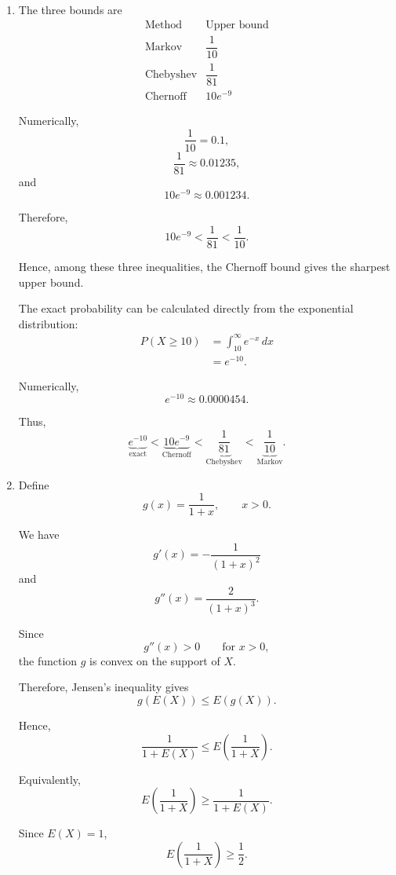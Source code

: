\documentclass[11pt]{article}
\newenvironment{solution}{
    \par
    \begin{tcolorbox}[
        colback=white,
        colframe=uwgold,
        boxrule=0.7pt,
        arc=2mm,
        left=3mm,
        right=3mm,
        top=2mm,
        bottom=2mm,
        breakable,
        before skip=0.5em,
        after skip=1em,
        title=\textbf{Solution},
        coltitle=uwpurple,
        fonttitle=\bfseries
    ]
}{
    \end{tcolorbox}
}
\begin{document}
\begin{solution}
\begin{enumerate}[label=(\alph*)]
\item The three bounds are
\[
\begin{array}{c|c}
\text{Method} & \text{Upper bound}\\
\hline
\text{Markov} & \dfrac{1}{10}\\[2mm]
\text{Chebyshev} & \dfrac{1}{81}\\[2mm]
\text{Chernoff} & 10e^{-9}
\end{array}
\]

Numerically,
\[
\frac{1}{10}=0.1,
\]
\[
\frac{1}{81}\approx0.01235,
\]
and
\[
10e^{-9}\approx0.001234.
\]

Therefore,
\[
10e^{-9}
<
\frac{1}{81}
<
\frac{1}{10}.
\]

Hence, among these three inequalities, the Chernoff bound gives the
sharpest upper bound.

The exact probability can be calculated directly from the exponential
distribution:
\[
\begin{aligned}
P(X\geq10)
&=
\int_{10}^{\infty}e^{-x}\,dx\\
&=
e^{-10}.
\end{aligned}
\]

Numerically,
\[
e^{-10}\approx0.0000454.
\]

Thus,
\[
\underbrace{e^{-10}}_{\text{exact}}
<
\underbrace{10e^{-9}}_{\text{Chernoff}}
<
\underbrace{\frac{1}{81}}_{\text{Chebyshev}}
<
\underbrace{\frac{1}{10}}_{\text{Markov}}.
\]


\item Define
\[
g(x)=\frac{1}{1+x},
\qquad x>0.
\]

We have
\[
g'(x)
=
-\frac{1}{(1+x)^2}
\]
and
\[
g''(x)
=
\frac{2}{(1+x)^3}.
\]

Since
\[
g''(x)>0
\qquad\text{for }x>0,
\]
the function \(g\) is convex on the support of \(X\).

Therefore, Jensen's inequality gives
\[
g(E(X))
\leq
E(g(X)).
\]

Hence,
\[
\frac{1}{1+E(X)}
\leq
E\left(\frac{1}{1+X}\right).
\]

Equivalently,
\[
E\left(\frac{1}{1+X}\right)
\geq
\frac{1}{1+E(X)}.
\]

Since \(E(X)=1\),
\[
E\left(\frac{1}{1+X}\right)
\geq
\frac12.
\]

\end{enumerate}

\end{solution}


\end{document}

